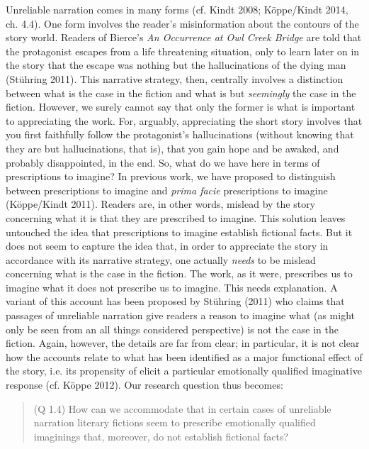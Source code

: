 Unreliable narration comes in many forms (cf. Kindt 2008; K\"oppe/Kindt
2014, ch. 4.4). One form involves the reader's misinformation about the
contours of the story world. Readers of Bierce's \emph{An Occurrence at
Owl Creek Bridge} are told that the protagonist escapes from a life
threatening situation, only to learn later on in the story that the
escape was nothing but the hallucinations of the dying man (St\"uhring
2011). This narrative strategy, then, centrally involves a distinction
between what is the case in the fiction and what is but \emph{seemingly}
the case in the fiction. However, we surely cannot say that only the
former is what is important to appreciating the work. For, arguably,
appreciating the short story involves that you first faithfully follow
the protagonist's hallucinations (without knowing that they are but
hallucinations, that is), that you gain hope and be awaked, and probably
disappointed, in the end. So, what do we have here in terms of
prescriptions to imagine? In previous work, we have proposed to
distinguish between prescriptions to imagine and \emph{prima facie}
prescriptions to imagine (K\"oppe/Kindt 2011). Readers are, in other
words, mislead by the story concerning what it is that they are
prescribed to imagine. This solution leaves untouched the idea that
prescriptions to imagine establish fictional facts. But it does not seem
to capture the idea that, in order to appreciate the story in accordance
with its narrative strategy, one actually \emph{needs} to be mislead
concerning what is the case in the fiction. The work, as it were,
prescribes us to imagine what it does not prescribe us to imagine. This
needs explanation. A variant of this account has been proposed by
St\"uhring (2011) who claims that passages of unreliable narration give
readers a reason to imagine what (as might only be seen from an all
things considered perspective) is not the case in the fiction. Again,
however, the details are far from clear; in particular, it is not clear
how the accounts relate to what has been identified as a major
functional effect of the story, i.e. its propensity of elicit a
particular emotionally qualified imaginative response (cf. K\"oppe 2012).
Our research question thus becomes:

\vspace{-.2cm}
\begin{quote}
(Q 1.4)  How can we accommodate that in certain cases of unreliable
narration literary fictions seem  to prescribe emotionally qualified
imaginings that, moreover, do not establish fictional facts?
\end{quote}
\vspace{-.2cm}

